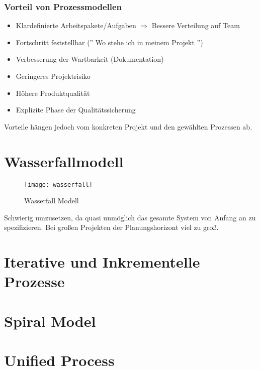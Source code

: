 \subsubsection{Vorteil von Prozessmodellen}
\begin{itemize}
    \item Klardefinierte Arbeitspakete/Aufgaben $\Rightarrow$ Bessere Verteilung
    auf Team
    \item Fortschritt feststellbar ('' Wo stehe ich in meinem Projekt '')
    \item Verbesserung der Wartbarkeit (Dokumentation)
    \item Geringeres Projektrisiko
    \item Höhere Produktqualität
    \item Explizite Phase der Qualitätssicherung
\end{itemize}
Vorteile hängen jedoch vom konkreten Projekt und den gewählten Prozessen ab.

\section{Wasserfallmodell}
\mbox{}\newline
\begin{figure}[!h]
  \centering
  \texttt{[image: wasserfall]}
  \caption{Wasserfall Modell}
\end{figure}

Schwierig umzusetzen, da quasi unmöglich das gesamte System von Anfang an
zu spezifizieren. Bei großen Projekten der Planungshorizont viel zu groß.




\section{Iterative und Inkrementelle Prozesse}

\section{Spiral Model}

\section{Unified Process}
